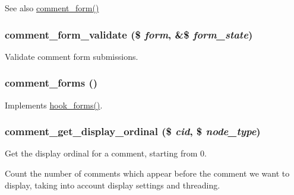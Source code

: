 \begin{DoxySeeAlso}{See also}
\hyperlink{group__forms_ga86e714d86cac517f85b3cadf42ba2977}{comment\_\-form()} 
\end{DoxySeeAlso}
\hypertarget{comment_8module_a37f7362a827269fc4d3f11bf4feae277}{
\subsubsection[{comment\_\-form\_\-validate}]{\setlength{\rightskip}{0pt plus 5cm}comment\_\-form\_\-validate (\$ {\em form}, \/  \&\$ {\em form\_\-state})}}
\label{comment_8module_a37f7362a827269fc4d3f11bf4feae277}
Validate comment form submissions. \hypertarget{comment_8module_aab24607a770dc7049e1408597bc4de44}{
\subsubsection[{comment\_\-forms}]{\setlength{\rightskip}{0pt plus 5cm}comment\_\-forms ()}}
\label{comment_8module_aab24607a770dc7049e1408597bc4de44}
Implements \hyperlink{group__hooks_gaa764fee74b85797f75c0c923cad628d5}{hook\_\-forms()}. \hypertarget{comment_8module_ab171028b3ac34f4aa94800451582e997}{
\subsubsection[{comment\_\-get\_\-display\_\-ordinal}]{\setlength{\rightskip}{0pt plus 5cm}comment\_\-get\_\-display\_\-ordinal (\$ {\em cid}, \/  \$ {\em node\_\-type})}}
\label{comment_8module_ab171028b3ac34f4aa94800451582e997}
Get the display ordinal for a comment, starting from 0.

Count the number of comments which appear before the comment we want to display, taking into account display settings and threading.


